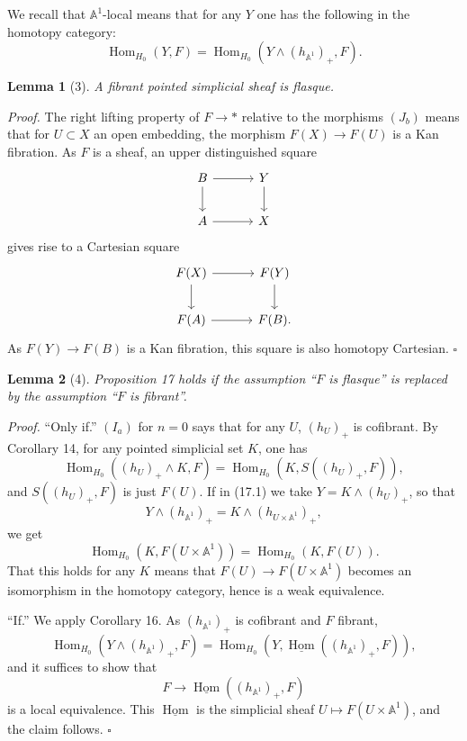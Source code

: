 \documentclass[11pt]{article}
\newcommand{\Aone}{\mathbb A^1}
\newcommand{\Hom}{\operatorname{Hom}}
\theoremstyle{deligne}
\newtheorem*{lemma*}{Lemma}
\newenvironment{proofdel}{\noindent\textit{Proof.}}{\hfill$\square$}
\newcommand{\uHom}{\underline{\Hom}}
\begin{document}
We recall that \(\Aone\)-local means that for any \(Y\) one has the following in the homotopy category:
\[
\Hom_{H_0}(Y,F)=\Hom_{H_0}(Y\wedge(h_{\Aone})_+,F). \tag{17.1}
\]

\begin{lemma*}[3]
A fibrant pointed simplicial sheaf is flasque.
\end{lemma*}

\begin{proofdel}
The right lifting property of \(F\to *\) relative to the morphisms \((J_b)\) means that for \(U\subset X\) an open embedding, the morphism \(F(X)\to F(U)\) is a Kan fibration. As \(F\) is a sheaf, an upper distinguished square
\[
\begin{tikzcd}[column sep=3.2em,row sep=2.0em]
B \arrow[r] \arrow[d] & Y \arrow[d] \\
A \arrow[r] & X
\end{tikzcd}
\]
gives rise to a Cartesian square
\[
\begin{tikzcd}[column sep=3.2em,row sep=2.0em]
F(X) \arrow[r] \arrow[d] & F(Y) \arrow[d] \\
F(A) \arrow[r] & F(B).
\end{tikzcd}
\]
As \(F(Y)\to F(B)\) is a Kan fibration, this square is also homotopy Cartesian.
\end{proofdel}

\begin{lemma*}[4]
Proposition 17 holds if the assumption ``\(F\) is flasque'' is replaced by the assumption ``\(F\) is fibrant''.
\end{lemma*}

\begin{proofdel}
``Only if.'' \((I_a)\) for \(n=0\) says that for any \(U\), \((h_U)_+\) is cofibrant. By Corollary 14, for any pointed simplicial set \(K\), one has
\[
\Hom_{H_0}((h_U)_+\wedge K,F)=\Hom_{H_0}(K,S((h_U)_+,F)),
\]
and \(S((h_U)_+,F)\) is just \(F(U)\). If in (17.1) we take \(Y=K\wedge(h_U)_+\), so that
\[
Y\wedge(h_{\Aone})_+=K\wedge(h_{U\times\Aone})_+,
\]
we get
\[
\Hom_{H_0}(K,F(U\times\Aone))=\Hom_{H_0}(K,F(U)).
\]
That this holds for any \(K\) means that \(F(U)\to F(U\times\Aone)\) becomes an isomorphism in the homotopy category, hence is a weak equivalence.

``If.'' We apply Corollary 16. As \((h_{\Aone})_+\) is cofibrant and \(F\) fibrant,
\[
\Hom_{H_0}(Y\wedge(h_{\Aone})_+,F)=\Hom_{H_0}(Y,\uHom((h_{\Aone})_+,F)),
\]
and it suffices to show that
\[
F\longrightarrow \uHom((h_{\Aone})_+,F)
\]
is a local equivalence. This \(\uHom\) is the simplicial sheaf \(U\mapsto F(U\times\Aone)\), and the claim follows.
\end{proofdel}
\end{document}
